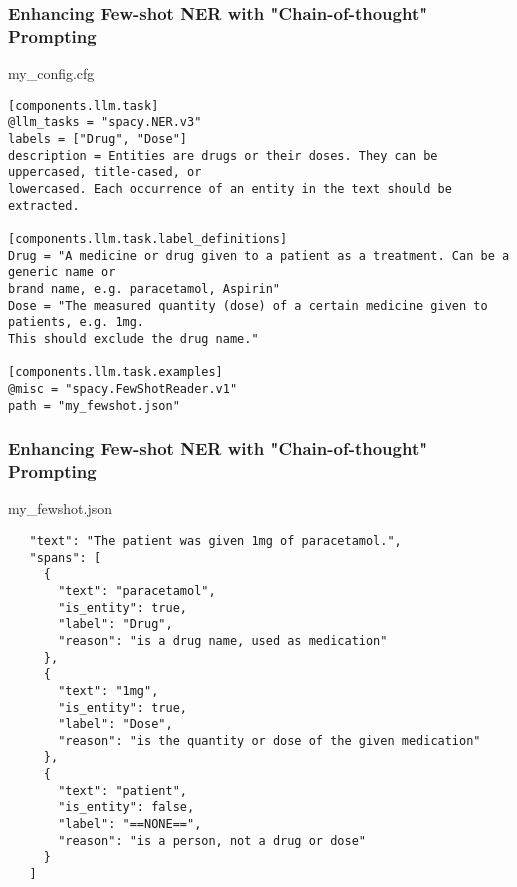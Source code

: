 \begin{frame}[fragile]\frametitle{Enhancing Few-shot NER with "Chain-of-thought" Prompting}
my\_conﬁg.cfg

\begin{lstlisting}
[components.llm.task]
@llm_tasks = "spacy.NER.v3"
labels = ["Drug", "Dose"]
description = Entities are drugs or their doses. They can be uppercased, title-cased, or 
lowercased. Each occurrence of an entity in the text should be extracted.

[components.llm.task.label_definitions]
Drug = "A medicine or drug given to a patient as a treatment. Can be a generic name or 
brand name, e.g. paracetamol, Aspirin"
Dose = "The measured quantity (dose) of a certain medicine given to patients, e.g. 1mg. 
This should exclude the drug name."

[components.llm.task.examples]
@misc = "spacy.FewShotReader.v1"
path = "my_fewshot.json"
\end{lstlisting}
\end{frame}

\begin{frame}[fragile]\frametitle{Enhancing Few-shot NER with "Chain-of-thought" Prompting}
my\_fewshot.json

\begin{lstlisting}
   "text": "The patient was given 1mg of paracetamol.",
   "spans": [
     {
       "text": "paracetamol",
       "is_entity": true,
       "label": "Drug",
       "reason": "is a drug name, used as medication"
     },
     {
       "text": "1mg",
       "is_entity": true,
       "label": "Dose",
       "reason": "is the quantity or dose of the given medication"
     },
     {
       "text": "patient",
       "is_entity": false,
       "label": "==NONE==",
       "reason": "is a person, not a drug or dose"
     }
   ]
 
\end{lstlisting}
\end{frame}


